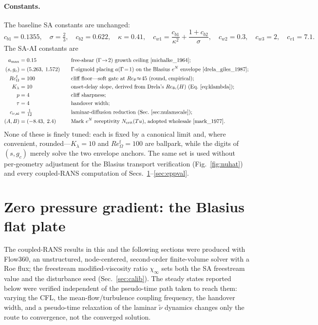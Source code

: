 \documentclass[journal]{new-aiaa}
\begin{document}
\paragraph{Constants.} The baseline SA constants are unchanged:
\begin{equation*}
  c_{b1}=0.1355,\quad \sigma=\tfrac{2}{3},\quad c_{b2}=0.622,\quad
  \kappa=0.41,\quad c_{w1}=\frac{c_{b1}}{\kappa^2}+\frac{1+c_{b2}}{\sigma},\quad
  c_{w2}=0.3,\quad c_{w3}=2,\quad c_{v1}=7.1 .
\end{equation*}
The SA-AI constants are
\begin{equation*}
  \begin{aligned}
    a_{\max}&=0.15 &\quad&\text{free-shear ($\Gamma\!\to\!2$) growth ceiling \cite{michalke_1964};}\\
    (s,g_c)&=(5.263,\;1.572) &&\text{$\Gamma$-sigmoid placing $a(\Gamma\!=\!1)$ on the Blasius $e^N$ envelope \cite{drela_giles_1987};}\\
    Re_\Omega^{\mathrm{f}}&=100 &&\text{cliff floor---soft gate at $Re_\theta\!\approx\!45$ (round, empirical);}\\
    K_\lambda&=10 &&\text{onset-delay slope, derived from Drela's $Re_{\theta c}(H)$ (Eq.~\eqref{eq:klambda});}\\
    p&=4 &&\text{cliff sharpness;}\\
    \tau&=4 &&\text{handover width;}\\
    c_{\nu,\mathrm{ai}}&=\tfrac{1}{12} &&\text{laminar-diffusion reduction (Sec.~\ref{sec:nulamscale});}\\
    (A,B)&=(-8.43,\;2.4) &&\text{Mack $e^N$ receptivity $N_\mathrm{crit}(Tu)$, adopted wholesale \cite{mack_1977}.}
  \end{aligned}
\end{equation*}
None of these is finely tuned: each is fixed by a canonical limit and, where
convenient, rounded---$K_\lambda\!=\!10$ and $Re_\Omega^{\mathrm{f}}\!=\!100$ are
ballpark, while the digits of $(s,g_c)$ merely solve the two envelope anchors. The
same set is used without per-geometry adjustment for the Blasius transport
verification (Fig.~\ref{fig:nuhat}) and every coupled-RANS computation of
Secs.~\ref{sec:flatplate}--\ref{sec:eppval}.

\section{Zero pressure gradient: the Blasius flat plate}\label{sec:flatplate}

The coupled-RANS results in this and the following sections were produced with
Flow360, an unstructured, node-centered, second-order finite-volume solver with
a Roe flux; the
freestream modified-viscosity ratio $\chi_\infty$ sets both the SA freestream value
and the disturbance seed (Sec.~\ref{sec:calib}). The steady states reported below
were verified independent of the pseudo-time path taken to reach them: varying
the CFL, the mean-flow/turbulence coupling frequency, the handover width, and a
pseudo-time relaxation of the laminar $\tilde\nu$ dynamics changes only the
route to convergence, not the converged solution.
\end{document}
